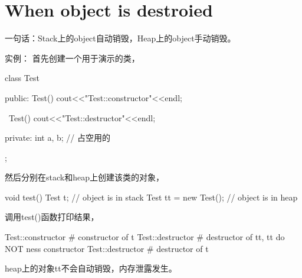 \section[When destroy object]{When object is destroied}
一句话：Stack上的object自动销毁，Heap上的object手动销毁。

实例：
首先创建一个用于演示的类，\\
\begin{cppcode}
class Test {
public:
    Test() {
      cout<<"Test::constructor"<<endl;
    }

    ~Test() {
      cout<<"Test::destructor"<<endl;
    }

private:
    int a, b; // 占空用的
};
\end{cppcode}

然后分别在stack和heap上创建该类的对象，

\begin{cppcode}
void test() {
    Test t; // object is in stack
    Test tt = new Test(); // object is in heap
}
\end{cppcode}

调用test()函数打印结果，

\begin{bashcode}
Test::constructor # constructor of t
Test::destructor # destructor of tt, tt do NOT ness constructor
Test::destructor  # destructor of t
\end{bashcode}

heap上的对象tt不会自动销毁，内存泄露发生。